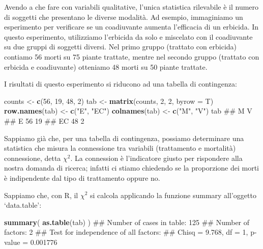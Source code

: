 \documentclass[a4paper,12pt,oneside]{book}
\newenvironment{Shaded}{\begin{snugshade}}{\end{snugshade}}
\newcommand{\KeywordTok}[1]{\textcolor[rgb]{0.13,0.29,0.53}{\textbf{#1}}}
\newcommand{\DataTypeTok}[1]{\textcolor[rgb]{0.13,0.29,0.53}{#1}}
\newcommand{\DecValTok}[1]{\textcolor[rgb]{0.00,0.00,0.81}{#1}}
\newcommand{\StringTok}[1]{\textcolor[rgb]{0.31,0.60,0.02}{#1}}
\newcommand{\NormalTok}[1]{#1}
\theoremstyle{definition}
\theoremstyle{definition}
\theoremstyle{definition}
\theoremstyle{remark}
\begin{document}
Avendo a che fare con variabili qualitative, l'unica statistica
rilevabile è il numero di soggetti che presentano le diverse modalità.
Ad esempio, immaginiamo un esperimento per verificare se un coadiuvante
aumenta l'efficacia di un erbicida. In questo esperimento, utilizziamo
l'erbicida da solo e miscelato con il coadiuvante su due gruppi di
soggetti diversi. Nel primo gruppo (trattato con erbicida) contiamo 56
morti su 75 piante trattate, mentre nel secondo gruppo (trattato con
erbicida e coadiuvante) otteniamo 48 morti su 50 piante trattate.

I risultati di questo esperimento si riducono ad una tabella di
contingenza:

\begin{Shaded}
\begin{Highlighting}[]
\NormalTok{counts <-}\StringTok{ }\KeywordTok{c}\NormalTok{(}\DecValTok{56}\NormalTok{, }\DecValTok{19}\NormalTok{, }\DecValTok{48}\NormalTok{, }\DecValTok{2}\NormalTok{)}
\NormalTok{tab <-}\StringTok{ }\KeywordTok{matrix}\NormalTok{(counts, }\DecValTok{2}\NormalTok{, }\DecValTok{2}\NormalTok{, }\DataTypeTok{byrow =}\NormalTok{ T)}
\KeywordTok{row.names}\NormalTok{(tab) <-}\StringTok{ }\KeywordTok{c}\NormalTok{(}\StringTok{"E"}\NormalTok{, }\StringTok{"EC"}\NormalTok{)}
\KeywordTok{colnames}\NormalTok{(tab) <-}\StringTok{ }\KeywordTok{c}\NormalTok{(}\StringTok{"M"}\NormalTok{, }\StringTok{"V"}\NormalTok{)}
\NormalTok{tab}
\NormalTok{##     M  V}
\NormalTok{## E  56 19}
\NormalTok{## EC 48  2}
\end{Highlighting}
\end{Shaded}

Sappiamo già che, per una tabella di contingenza, possiamo determinare
una statistica che misura la connessione tra variabili (trattamento e
mortalità) connessione, detta \(\chi^2\). La connession è l'indicatore
giusto per rispondere alla nostra domanda di ricerca; infatti ci stiamo
chiedendo se la proporzione dei morti è indipendente dal tipo di
trattamento oppure no.

Sappiamo che, con R, il \(\chi^2\) si calcola applicando la funzione
summary all'oggetto `data.table':

\begin{Shaded}
\begin{Highlighting}[]
\KeywordTok{summary}\NormalTok{( }\KeywordTok{as.table}\NormalTok{(tab) )}
\NormalTok{## Number of cases in table: 125 }
\NormalTok{## Number of factors: 2 }
\NormalTok{## Test for independence of all factors:}
\NormalTok{##  Chisq = 9.768, df = 1, p-value = 0.001776}
\end{Highlighting}
\end{Shaded}
\end{document}
